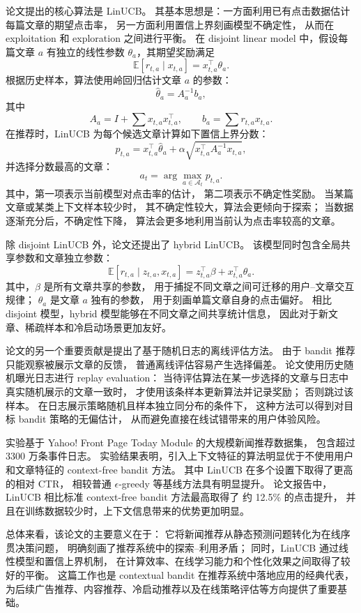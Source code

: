 \documentclass[11pt]{ctexart}
\begin{document}
论文提出的核心算法是 LinUCB。
其基本思想是：一方面利用已有点击数据估计每篇文章的期望点击率，
另一方面利用置信上界刻画模型不确定性，
从而在 exploitation 和 exploration 之间进行平衡。
在 disjoint linear model 中，假设每篇文章 \(a\) 有独立的线性参数
\(\theta_a\)，其期望奖励满足
\[
\mathbb{E}[r_{t,a} \mid x_{t,a}]
=
x_{t,a}^{\top}\theta_a .
\]
根据历史样本，算法使用岭回归估计文章 \(a\) 的参数：
\[
\hat{\theta}_a = A_a^{-1} b_a ,
\]
其中
\[
A_a = I + \sum x_{t,a}x_{t,a}^{\top},
\qquad
b_a = \sum r_{t,a}x_{t,a}.
\]
在推荐时，LinUCB 为每个候选文章计算如下置信上界分数：
\[
p_{t,a}
=
x_{t,a}^{\top}\hat{\theta}_a
+
\alpha
\sqrt{x_{t,a}^{\top} A_a^{-1} x_{t,a}},
\]
并选择分数最高的文章：
\[
a_t = \arg\max_{a \in \mathcal{A}_t} p_{t,a}.
\]
其中，第一项表示当前模型对点击率的估计，
第二项表示不确定性奖励。
当某篇文章或某类上下文样本较少时，
其不确定性较大，算法会更倾向于探索；
当数据逐渐充分后，不确定性下降，
算法会更多地利用当前认为点击率较高的文章。

除 disjoint LinUCB 外，论文还提出了 hybrid LinUCB。
该模型同时包含全局共享参数和文章独立参数：
\[
\mathbb{E}[r_{t,a} \mid z_{t,a}, x_{t,a}]
=
z_{t,a}^{\top}\beta
+
x_{t,a}^{\top}\theta_a .
\]
其中，\(\beta\) 是所有文章共享的参数，
用于捕捉不同文章之间可迁移的用户--文章交互规律；
\(\theta_a\) 是文章 \(a\) 独有的参数，
用于刻画单篇文章自身的点击偏好。
相比 disjoint 模型，hybrid 模型能够在不同文章之间共享统计信息，
因此对于新文章、稀疏样本和冷启动场景更加友好。

论文的另一个重要贡献是提出了基于随机日志的离线评估方法。
由于 bandit 推荐只能观察被展示文章的反馈，
普通离线评估容易产生选择偏差。
论文使用历史随机曝光日志进行 replay evaluation：
当待评估算法在某一步选择的文章与日志中真实随机展示的文章一致时，
才使用该条样本更新算法并记录奖励；
否则跳过该样本。
在日志展示策略随机且样本独立同分布的条件下，
这种方法可以得到对目标 bandit 策略的无偏估计，
从而避免直接在线试错带来的用户体验风险。

实验基于 Yahoo! Front Page Today Module 的大规模新闻推荐数据集，
包含超过 3300 万条事件日志。
实验结果表明，引入上下文特征的算法明显优于不使用用户和文章特征的
context-free bandit 方法。
其中 LinUCB 在多个设置下取得了更高的相对 CTR，
相较普通 \(\epsilon\)-greedy 等基线方法具有明显提升。
论文报告中，LinUCB 相比标准 context-free bandit 方法最高取得了
约 12.5\% 的点击提升，
并且在训练数据较少时，上下文信息带来的优势更加明显。

总体来看，该论文的主要意义在于：
它将新闻推荐从静态预测问题转化为在线序贯决策问题，
明确刻画了推荐系统中的探索--利用矛盾；
同时，LinUCB 通过线性模型和置信上界机制，
在计算效率、在线学习能力和个性化效果之间取得了较好的平衡。
这篇工作也是 contextual bandit 在推荐系统中落地应用的经典代表，
为后续广告推荐、内容推荐、冷启动推荐以及在线策略评估等方向提供了重要基础。
\end{document}
